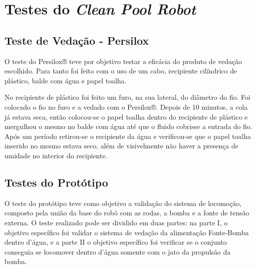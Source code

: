\chapter{Testes do \textit{Clean Pool Robot}} \label{ch:tests-robot}
\section{Teste de Vedação - Persilox}
O teste do Persilox® teve por objetivo testar a eficácia do produto de vedação escolhido. Para tanto foi feito com o uso de um cabo, recipiente cilíndrico de plástico, balde com água e papel toalha.

No recipiente de plástico foi feito um furo, na sua lateral, do diâmetro do fio. Foi colocado o fio no furo e a vedado com o Persilox®. Depois de 10 minutos, a cola já estava seca, então colocou-se o papel toalha dentro do recipiente de plástico e mergulhou o mesmo no balde com água até que o fluido cobrisse a entrada do fio. Após um período retirou-se o recipiente da água e verificou-se que o papel toalha inserido no mesmo estava seco, além de visivelmente não haver a presença de umidade no interior do recipiente.

\section{Testes do Protótipo}
O teste do protótipo teve como objetivo a validação do  sistema de locomoção, composto pela união da base do robô com as rodas, a bomba e a fonte de tensão externa. O teste realizado pode ser dividido em duas partes: na parte I, o objetivo específico foi validar o sistema de vedação da alimentação Fonte-Bomba dentro d’água, e a  parte II o objetivo específico foi verificar se o conjunto conseguia se locomover dentro d’água somente com o jato da propulsão da bomba.

